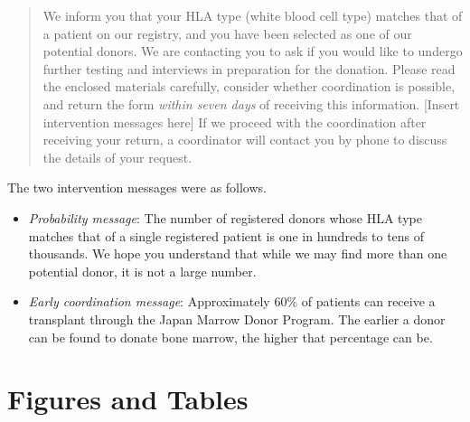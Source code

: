 \documentclass[12pt, a4paper]{article}
\providecommand{\tightlist}{%
  \setlength{\itemsep}{0pt}\setlength{\parskip}{0pt}}
\begin{document}
\begin{quote}
We inform you that your HLA type (white blood cell type) matches that of a patient on our registry, and you have been selected as one of our potential donors. We are contacting you to ask if you would like to undergo further testing and interviews in preparation for the donation. Please read the enclosed materials carefully, consider whether coordination is possible, and return the form \emph{within seven days} of receiving this information. {[}Insert intervention messages here{]} If we proceed with the coordination after receiving your return, a coordinator will contact you by phone to discuss the details of your request.
\end{quote}

The two intervention messages were as follows.

\begin{itemize}
\tightlist
\item
  \emph{Probability message}: The number of registered donors whose HLA type matches that of a single registered patient is one in hundreds to tens of thousands. We hope you understand that while we may find more than one potential donor, it is not a large number.
\item
  \emph{Early coordination message}: Approximately 60\% of patients can receive a transplant through the Japan Marrow Donor Program. The earlier a donor can be found to donate bone marrow, the higher that percentage can be.
\end{itemize}

\setcounter{figure}{0}
\setcounter{table}{0}
\renewcommand\thefigure{\thesection\arabic{figure}}
\renewcommand{\thetable}{\thesection\arabic{table}}
\renewcommand{\theHfigure}{\thesection\arabic{figure}}
\renewcommand{\theHtable}{\thesection\arabic{table}}

\hypertarget{figtab}{%
\section{Figures and Tables}\label{figtab}}
\end{document}

